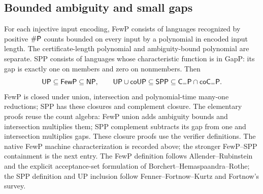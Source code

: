 \begin{result}
\subsection{Bounded ambiguity and small gaps}
For each injective input encoding, FewP consists of languages recognized by
positive $\#\mathsf{P}$ counts bounded on every input by a polynomial in encoded
input length. The certificate-length polynomial and ambiguity-bound polynomial
are separate. SPP consists of languages whose characteristic function is in
GapP: its gap is exactly one on members and zero on nonmembers. Then
\[
\mathsf{UP}\subseteq\mathsf{FewP}\subseteq\mathsf{NP},\qquad
\mathsf{UP}\cup\mathsf{coUP}\subseteq\mathsf{SPP}
\subseteq\mathsf{C}_{=}\mathsf{P}\cap\mathsf{coC}_{=}\mathsf{P}.
\]
FewP is closed under union, intersection and polynomial-time many-one reductions;
SPP has these closures and complement closure. The elementary proofs reuse the
count algebra: FewP union adds ambiguity bounds and intersection multiplies them;
SPP complement subtracts its gap from one and intersection multiplies gaps.
These closure proofs use the verifier definitions. The native FewP machine
characterization is recorded above; the stronger FewP--SPP containment is the next entry.
The FewP definition follows Allender--Rubinstein and the explicit acceptance-set
formulation of Borchert--Hemaspaandra--Rothe; the SPP definition and UP inclusion
follow Fenner--Fortnow--Kurtz and Fortnow's survey.
\citep{AllenderRubinstein1988}\citep[Section 1]{BorchertHemaspaandraRothe2000}
\citep{FennerFortnowKurtz1994}\citep[Classification 4.4 and Corollary 4.11]{Fortnow1997}
\end{result}

